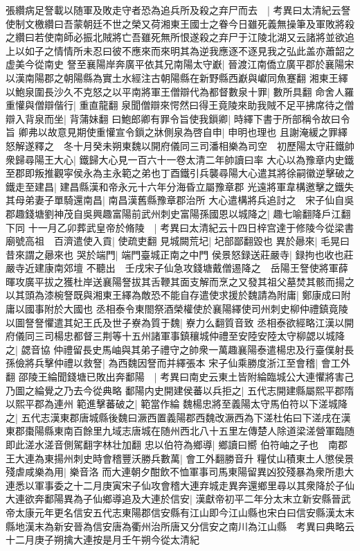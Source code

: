 張纘病足詧載以随軍及敗走守者恐為追兵所及殺之弃尸而去　|{
	考異曰太清紀云詧使制文檄纘曰吾蒙朝廷不世之榮又荷湘東王國士之眷今日雖死義無操筆及軍敗將殺之纘曰若使南師必振北賊將亡吾雖死無所恨遂殺之弃尸于江陵北湖又云諸將並欲追上以如子之情情所未忍曰彼不應來而來明其為逆我應逐不逐見我之弘此盖亦蕭韶之虚美今從南史}
詧至襄陽岸奔廣平依其兄南陽太守巚|{
	晉渡江南僑立廣平郡於襄陽宋以漢南陽郡之朝陽縣為實土水經注古朝陽縣在新野縣西巚與巘同魚蹇翻}
湘東王繹以鮑泉圍長沙久不克怒之以平南將軍王僧辯代為都督數泉十罪|{
	數所具翻}
命舍人羅重懽與僧辯偕行|{
	重直龍翻}
泉聞僧辯來愕然曰得王竟陵來助我賊不足平拂席待之僧辯入背泉而坐|{
	背蒲妹翻}
曰鮑郎卿有罪令旨使我鎻卿|{
	時繹下書于所部稱令故曰令旨}
卿弗以故意見期使重懽宣令鎻之牀側泉為啓自申|{
	申明也理也}
且謝淹緩之罪繹怒解遂釋之　冬十月癸未朔東魏以開府儀同三司潘相樂為司空　初歷陽太守莊鐵帥衆歸尋陽王大心|{
	鐵歸大心見一百六十一卷太清二年帥讀曰率}
大心以為豫章内史鐵至郡即叛推觀寜侯永為主永範之弟也丁酉鐵引兵襲尋陽大心遣其將徐嗣徽逆擊破之鐵走至建昌|{
	建昌縣漢和帝永元十六年分海昏立屬豫章郡}
光遠將軍韋構邀擊之鐵失其母弟妻子單騎還南昌|{
	南昌漢舊縣豫章郡治所}
大心遣構將兵追討之　宋子仙自吳郡趣錢塘劉神茂自吳興趣富陽前武州刺史富陽孫國恩以城降之|{
	趣七喻翻降戶江翻下同}
十一月乙卯葬武皇帝於脩陵　|{
	考異曰太清紀云十四日梓宫達于修陵今從梁書}
廟號高祖　百濟遣使入貢|{
	使疏吏翻}
見城闕荒圮|{
	圮部鄙翻毀也}
異於曏來|{
	毛晃曰昔來謂之曏來也}
哭於端門|{
	端門臺城正南之中門}
侯景怒録送莊嚴寺|{
	録拘也收也莊嚴寺近建康南郊壇}
不聽出　壬戌宋子仙急攻錢塘戴僧逷降之　岳陽王詧使將軍薛暉攻廣平拔之獲杜岸送襄陽詧拔其舌鞭其面支解而烹之又發其祖父墓焚其骸而揚之以其頭為漆椀詧既與湘東王繹為敵恐不能自存遣使求援於魏請為附庸|{
	鄭康成曰附庸以國事附於大國也}
丞相泰令東閤祭酒榮權使於襄陽繹使司州刺史柳仲禮鎮竟陵以圖詧詧懼遣其妃王氏及世子嶚為質于魏|{
	嶚力么翻質音致}
丞相泰欲經略江漢以開府儀同三司楊忠都督三荆等十五州諸軍事鎮穰城仲禮至安陸安陸太守柳勰以城降之|{
	勰音協}
仲禮留長史馬岫與其弟子禮守之帥衆一萬趣襄陽泰遣楊忠及行臺僕射長孫儉將兵擊仲禮以救詧|{
	為西魏因詧而并繹張本}
宋子仙乘勝度浙江至會稽|{
	會工外翻}
邵陵王綸聞錢塘已敗出奔鄱陽　|{
	考異曰南史云東土皆附綸臨城公大連懼將害己乃圖之綸覺之乃去今從典略}
鄱陽内史開建侯蕃以兵拒之|{
	五代志開建縣屬熙平郡隋以熙平郡為連州}
範進擊蕃破之|{
	範當作綸}
魏楊忠將至義陽太守馬伯符以下溠城降之|{
	五代志漢東郡唐城縣後魏曰㵐西置義陽郡西魏改㵐西為下溠杜佑曰下溠戌在漢東郡棗陽縣東南百餘里九域志唐城在随州西北八十五里左傳楚人除道梁溠營軍臨随即此溠水溠音側駕翻字林壮加翻}
忠以伯符為鄉導|{
	鄉讀曰嚮}
伯符岫之子也　南郡王大連為東揚州刺史時會稽豐沃勝兵數萬|{
	會工外翻勝音升}
糧仗山積東土人懲侯景殘虐咸樂為用|{
	樂音洛}
而大連朝夕酣飲不恤軍事司馬東陽留異凶狡殘暴為衆所患大連悉以軍事委之十二月庚寅宋子仙攻會稽大連弃城走異奔還鄉里尋以其衆降於子仙大連欲奔鄱陽異為子仙鄉導追及大連於信安|{
	漢獻帝初平二年分太末立新安縣晉武帝太康元年更名信安五代志東陽郡信安縣有江山即今江山縣也宋白曰信安縣漢太末縣地漢末為新安晉為信安唐為衢州治所唐又分信安之南川為江山縣　考異曰典略云十二月庚子朔擒大連按是月壬午朔今從太清紀}
